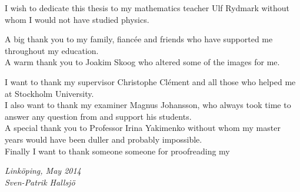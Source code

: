 \begin{acknowledgments}
I wish to dedicate this thesis to my mathematics teacher Ulf Rydmark without whom I would not have studied physics.

A big thank you to my family, fiancée and friends who have supported me throughout my education.\\
A warm thank you to Joakim Skoog who altered some of the images for me.


I want to thank my supervisor Christophe Clément and all those who helped me at Stockholm University. \\
I also want to thank my examiner Magnus Johansson, who always took time to answer any question from and support his students. \\ 
A special thank you to Professor Irina Yakimenko without whom my master years would have been duller and probably impossible.\\
Finally I want to thank someone someone for proofreading my

  \addvspace{1em}
  \begin{flushright}
    \textit{%
      Linköping, May 2014\\
      Sven-Patrik Hallsjö%
    }
  \end{flushright}
\end{acknowledgments}
